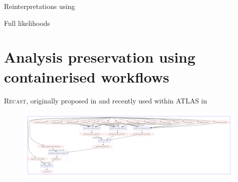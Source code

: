 Reinterpretations using 

Full likelihoods~\cite{ATL-PHYS-PUB-2019-029}


\section{Analysis preservation using containerised workflows}\label{sec:recast_implementation}




\textsc{Recast}, originally proposed in \cite{RECAST_cranmer} and recently used within ATLAS in \eg {}\cite{ATL-PHYS-PUB-2019-032}




 \begin{figure}
	\centering\includegraphics[width=\textwidth]{yadage_workflow_instance}
	\caption{}
	\label{fig:recast_workflow}
\end{figure}

